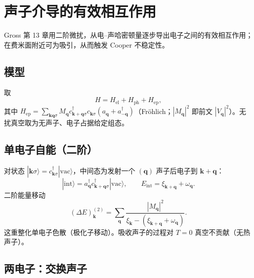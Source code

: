 \section{声子介导的有效相互作用}

Gross 第 13 章用二阶微扰，从电--声哈密顿量逐步导出电子之间的有效相互作用；在费米面附近可为吸引，从而触发 Cooper 不稳定性。

\subsection{模型}

取
\begin{equation}
  H
  =H_{\mathrm{el}}+H_{\mathrm{ph}}+H_{\mathrm{ep}},
\end{equation}
其中 $H_{\mathrm{ep}}=\sum_{\mathbf{k}\mathbf{q}\sigma}M_{\mathbf{q}}
c_{\mathbf{k}+\mathbf{q}\sigma}^\dagger c_{\mathbf{k}\sigma}
(a_{\mathbf{q}}+a_{-\mathbf{q}}^\dagger)$（Fr\"ohlich；$|M_{\mathbf{q}}|^2$ 即前文 $|V_{\mathbf{q}}|^2$）。无扰真空取为无声子、电子占据给定组态。

\subsection{单电子自能（二阶）}

对状态 $|\mathbf{k}\sigma\rangle=c_{\mathbf{k}\sigma}^\dagger|\mathrm{vac}\rangle$，中间态为发射一个 $(\mathbf{q})$ 声子后电子到 $\mathbf{k}+\mathbf{q}$：
\begin{equation}
  |\mathrm{int}\rangle
  =a_{\mathbf{q}}^\dagger c_{\mathbf{k}+\mathbf{q}\sigma}^\dagger|\mathrm{vac}\rangle,
  \qquad
  E_{\mathrm{int}}
  =\xi_{\mathbf{k}+\mathbf{q}}+\omega_{\mathbf{q}}.
\end{equation}
二阶能量移动
\begin{equation}
  (\Delta E)^{(2)}_{\mathbf{k}}
  =\sum_{\mathbf{q}}
  \frac{|M_{\mathbf{q}}|^2}
  {\xi_{\mathbf{k}}-(\xi_{\mathbf{k}+\mathbf{q}}+\omega_{\mathbf{q}})}.
\label{eq:polaron_shift}
\end{equation}
这重整化单电子色散（极化子移动）。吸收声子的过程对 $T=0$ 真空不贡献（无热声子）。

\subsection{两电子：交换声子}

